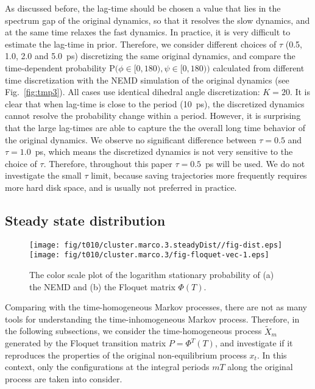 \documentclass[aps, pre, preprint,unsortedaddress,a4paper,onecolumn]{revtex4}
\newcommand{\prob}{\textrm{P}}
\begin{document}
As discussed before, the lag-time should be chosen a value that lies
in the spectrum gap of the original dynamics, so that it resolves the
slow dynamics, and at the same time relaxes the fast dynamics. In
practice, it is very difficult to estimate the lag-time in
prior. Therefore, we consider 
different choices of $\tau$ (0.5, 1.0, 2.0 and 5.0~ps)
discretizing the same original dynamics, and compare the
time-dependent probability $\prob\big(\phi\in[0,180), \psi\in
[0,180)\big)$ calculated from different time discretization with the NEMD simulation
of the original dynamics
(see Fig.~\ref{fig:tmp3}).  All cases use identical dihedral angle discretization: $K=20$.
It is clear that when lag-time is close to the period (10~ps), the
discretized dynamics cannot resolve the probability change within a
period. However, it is surprising  that the large lag-times are able to capture the
the overall long time behavior of the original dynamics.
We observe no significant difference between $\tau=0.5$ and
$\tau=1.0$~ps, which means the discretized dynamics is not very sensitive
to the choice of $\tau$.
Therefore, throughout this paper $\tau=0.5$~ps will be used.
We do not investigate the small $\tau$ limit, because saving trajectories
more frequently requires more hard disk space, and is usually not preferred in practice.

\subsection{Steady state distribution}


\begin{figure}
  \centering  
  \texttt{[image: fig/t010/cluster.marco.3.steadyDist//fig-dist.eps]}
  \texttt{[image: fig/t010/cluster.marco.3/fig-floquet-vec-1.eps]}
  \caption{The color scale plot of the logarithm stationary probability
    of (a) the NEMD  and (b)
    the Floquet matrix $\Phi(T)$.
  }
  \label{fig:num-1}
\end{figure}

Comparing with the time-homogeneous Markov processes, there are not as
many tools for understanding the time-inhomogeneous Markov process.
Therefore, in the following subsections,
we consider the time-homogeneous process $\tilde X_{m}$ generated by
the Floquet transition matrix $P = \Phi^T(T)$, and investigate if it
reproduces the properties of the original  non-equilibrium process $x_t$.
In this context, only the configurations at the  integral periods $mT$ along the original process
are taken into consider.
\end{document}
